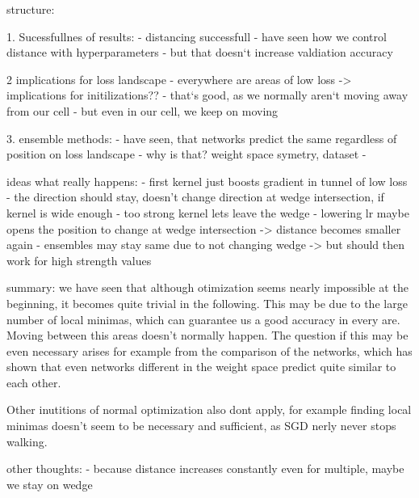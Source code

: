 




















structure:

1. Sucessfullnes of results:
- distancing successfull
- have seen how we control distance with hyperparameters
- but that doesn`t increase valdiation accuracy

2 implications for loss landscape
- everywhere are areas of low loss -> implications for initilizations??
- that`s good, as we normally aren`t moving away from our cell
- but even in our cell, we keep on moving


3. ensemble methods:
- have seen, that networks predict the same regardless of position on loss landscape
- why is that? weight space symetry, dataset
- 


ideas what really happens:
- first kernel just boosts gradient in tunnel of low loss
- the direction should stay, doesn't change direction at wedge intersection, if kernel is wide enough
- too strong kernel lets leave the wedge
- lowering lr maybe opens the position to change at wedge intersection -> distance becomes smaller again
- ensembles may stay same due to not changing wedge -> but should then work for high strength values




summary: we have seen that although otimization seems nearly impossible at the
beginning, it becomes quite trivial in the following. This may be due to the
large number of local minimas, which can guarantee us a good accuracy in every
are. Moving between this areas doesn't normally happen. The question if this may
be even necessary arises for example from the comparison of the networks, which
has shown that even networks different in the weight space predict quite similar
to each other.

Other inutitions of normal optimization also dont apply, for
example finding local minimas doesn't seem to be necessary and sufficient, as
SGD nerly never stops walking.


other thoughts:
- because distance increases constantly even for multiple, maybe we stay on wedge